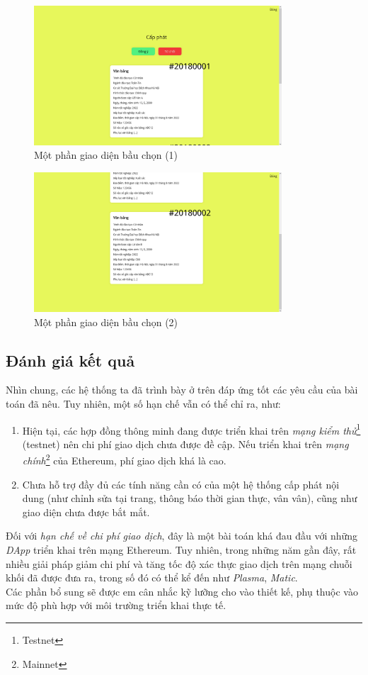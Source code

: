 \newpage
\begin{figure}[!ht]
    \centering
    \includegraphics[width=350px]{anh/giai-phap/giao-dien-bau-chon-1.png}
    \caption{Một phần giao diện bầu chọn (1)}
\end{figure}

\begin{figure}[!ht]
    \centering
    \includegraphics[width=350px]{anh/giai-phap/giao-dien-bau-chon-2.png}
    \caption{Một phần giao diện bầu chọn (2)}
\end{figure}

\newpage
\subsection*{Đánh giá kết quả}

Nhìn chung, các hệ thống ta đã trình bày ở trên đáp ứng tốt các yêu cầu của bài toán đã nêu. Tuy nhiên, một số hạn chế vẫn có thể chỉ ra, như:
\begin{enumerate}
    \item Hiện tại, các hợp đồng thông minh đang được triển khai trên \textit{mạng kiểm thử}\footnote{Testnet} (testnet) nên chi phí giao dịch chưa được đề cập. Nếu triển khai trên \textit{mạng chính}\footnote{Mainnet} của Ethereum, phí giao dịch khá là cao.\label{cons/transaction-fee}
    \item Chưa hỗ trợ đầy đủ các tính năng cần có của một hệ thống cấp phát nội dung (như chỉnh sửa tại trang, thông báo thời gian thực, vân vân), cũng như giao diện chưa được bắt mắt.
\end{enumerate}

Đối với \textit{hạn chế về chi phí giao dịch}, đây là một bài toán khá đau đầu với những \textit{DApp} triển khai trên mạng Ethereum. Tuy nhiên, trong những năm gần đây, rất nhiều giải pháp giảm chi phí và tăng tốc độ xác thực giao dịch trên mạng chuỗi khối đã được đưa ra, trong số đó có thể kể đến như \textit{Plasma}, \textit{Matic}.\\

Các phần bổ sung sẽ được em cân nhắc kỹ lưỡng cho vào thiết kế, phụ thuộc vào mức độ phù hợp với môi trường triển khai thực tế.